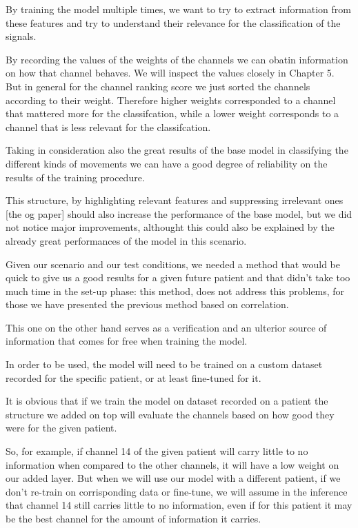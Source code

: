 \documentclass{Configuration_Files/PoliMi3i_thesis}
\begin{document}
By training the model multiple times, we want to try to extract information from these features and try to understand their relevance for the classification of the signals.

By recording the values of the weights of the channels we can obatin information on how that channel behaves.
We will inspect the values closely in Chapter 5.
But in general for the channel ranking score we just sorted the channels according to their weight.
Therefore higher weights corresponded to a channel that mattered more for the classifcation, while a lower weight corresponds to a channel that is less relevant for the classifcation.

Taking in consideration also the great results of the base model in classifying the different kinds of movements we can have a good degree of reliability on the results of the training procedure.

This structure, by highlighting relevant features and suppressing irrelevant ones [the og paper] should also increase the performance of the base model, but we did not notice major improvements, althought this could also be explained by the already great performances of the model in this scenario.

Given our scenario and our test conditions, we needed a method that would be quick to give us a good results for a given future patient and that didn't take too much time in the set-up phase: this method, does not address this problems, for those we have presented the previous method based on correlation.

This one on the other hand serves as a verification and an ulterior source of information that comes for free when training the model.

In order to be used, the model will need to be trained on a custom dataset recorded for the specific patient, or at least fine-tuned for it.

It is obvious that if we train the model on dataset recorded on a patient the structure we added on top will evaluate the channels based on how good they were for the given patient.

So, for example, if channel 14 of the given patient will carry little to no information when compared to the other channels, it will have a low weight on our added layer.
But when we will use our model with a different patient, if we don't re-train on corrisponding data or fine-tune, we will assume in the inference that channel 14 still carries little to no information, even if for this patient it may be the best channel for the amount of information it carries.
\end{document}
